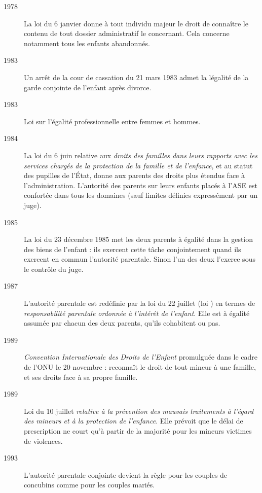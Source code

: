 \begin{description}
\item[1978] La loi du 6 janvier donne à tout individu majeur le droit de connaître le contenu de tout dossier administratif le concernant. Cela concerne notamment tous les enfants abandonnés.

\item[1983] Un arrêt de la cour de cassation du 21 mars 1983 admet la légalité de la garde conjointe de l'enfant après divorce.

\item[1983] 
Loi sur l'égalité professionnelle entre femmes et hommes.

\item[1984] La loi du 6 juin relative aux \emph{droits des familles dans leurs rapports avec les services chargés de la protection de la famille et de l'enfance}, et au statut des pupilles de l'État, donne aux parents des droits plus étendus face à l'administration. L'autorité des parents sur leurs enfants placés à l'ASE est confortée dans tous les domaines (sauf limites définies expressément par un juge).

\item[1985] La loi du 23 décembre 1985 met les deux parents à égalité dans la gestion des biens de l'enfant : ils exercent cette tâche conjointement quand ils exercent en commun l'autorité parentale. Sinon l'un des deux l'exerce sous le contrôle du juge.

\item[1987] L'autorité parentale est redéfinie par la loi du 22 juillet (loi ) en termes de \emph{responsabilité parentale ordonnée à l'intérêt de l'enfant}. Elle est à égalité assumée par chacun des deux parents, qu'ils cohabitent ou pas.

\item[1989] \emph{Convention Internationale des Droits de l'Enfant} promulguée dans le cadre de l'ONU le 20 novembre : reconnaît le droit de tout mineur à une famille, et ses droits face à sa propre famille.

\item[1989] 
Loi du 10 juillet \emph{relative à la prévention des mauvais traitements à l'égard des mineurs et à la protection de l'enfance}. Elle prévoit que le délai de prescription ne court qu'à partir de la majorité pour les mineurs victimes de violences.

\item[1993] L'autorité parentale conjointe devient la règle pour les couples de concubins comme pour les couples mariés.


\end{description}
